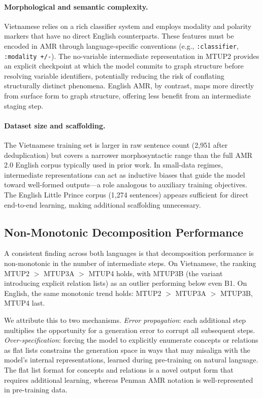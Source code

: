 \documentclass[11pt,a4paper]{article}
\begin{document}
\paragraph{Morphological and semantic complexity.}
Vietnamese relies on a rich classifier system and employs modality and
polarity markers that have no direct English counterparts. These features must
be encoded in AMR through language-specific conventions (e.g.,
\texttt{:classifier}, \texttt{:modality +/-}). The no-variable intermediate
representation in MTUP2 provides an explicit checkpoint at which the model
commits to graph structure before resolving variable identifiers, potentially
reducing the risk of conflating structurally distinct phenomena. English AMR, by
contrast, maps more directly from surface form to graph structure, offering
less benefit from an intermediate staging step.

\paragraph{Dataset size and scaffolding.}
The Vietnamese training set is larger in raw sentence count (2,951 after
deduplication) but covers a narrower morphosyntactic range than the full AMR
2.0 English corpus typically used in prior work. In small-data regimes,
intermediate representations can act as inductive biases that guide the model
toward well-formed outputs---a role analogous to auxiliary training objectives.
The English Little Prince corpus (1,274 sentences) appears sufficient for
direct end-to-end learning, making additional scaffolding unnecessary.

\subsection{Non-Monotonic Decomposition Performance}

A consistent finding across both languages is that decomposition performance
is non-monotonic in the number of intermediate steps. On Vietnamese, the
ranking MTUP2 $>$ MTUP3A $>$ MTUP4 holds, with MTUP3B (the variant
introducing explicit relation lists) as an outlier performing below even B1.
On English, the same monotonic trend holds: MTUP2 $>$ MTUP3A $>$ MTUP3B,
MTUP4 last.

We attribute this to two mechanisms. \emph{Error propagation}: each additional
step multiplies the opportunity for a generation error to corrupt all subsequent
steps. \emph{Over-specification}: forcing the model to explicitly enumerate
concepts or relations as flat lists constrains the generation space in ways
that may misalign with the model's internal representations, learned during
pre-training on natural language. The flat list format for concepts and
relations is a novel output form that requires additional learning, whereas
Penman AMR notation is well-represented in pre-training data.
\end{document}
